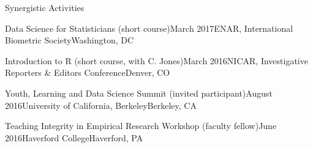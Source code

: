 \documentclass{resume} %
\begin{document}

\begin{rSection}{Synergistic Activities}


\begin{sSubsection}{Data Science for Statisticians}{ (short course)}{March 2017}{ENAR, International Biometric Society}{Washington, DC}
\end{sSubsection}

\begin{sSubsection}{Introduction to R }{ (short course, with C. Jones)}{March 2016}{NICAR, Investigative Reporters \& Editors Conference}{Denver, CO}
\end{sSubsection}

\begin{sSubsection}{Youth, Learning and Data Science Summit}{ (invited participant)}{August 2016}{University of California, Berkeley}{Berkeley, CA}
\end{sSubsection}

\begin{sSubsection}{Teaching Integrity in Empirical Research Workshop}{ (faculty fellow)}{June 2016}{Haverford College}{Haverford, PA}
\end{sSubsection}

\end{rSection}
\end{document}
